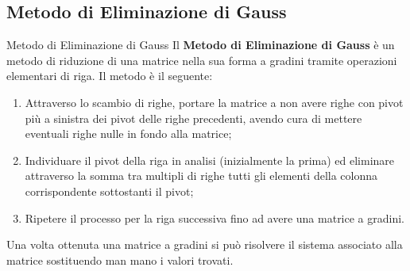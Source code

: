 \subsection{Metodo di Eliminazione di Gauss}
\begin{teo}{Metodo di Eliminazione di Gauss}
    Il \textbf{Metodo di Eliminazione di Gauss} è un metodo di riduzione di una matrice nella sua forma a gradini tramite operazioni elementari di riga. Il metodo è il seguente:
    \begin{enumerate}
        \item Attraverso lo scambio di righe, portare la matrice a non avere righe con pivot più a sinistra dei pivot delle righe precedenti, avendo cura di mettere eventuali righe nulle in fondo alla matrice;
        \item Individuare il pivot della riga in analisi (inizialmente la prima) ed eliminare attraverso la somma tra multipli di righe tutti gli elementi della colonna corrispondente sottostanti il pivot;
        \item Ripetere il processo per la riga successiva fino ad avere una matrice a gradini.
    \end{enumerate}
\end{teo}
Una volta ottenuta una matrice a gradini si può risolvere il sistema associato alla matrice sostituendo man mano i valori trovati.
